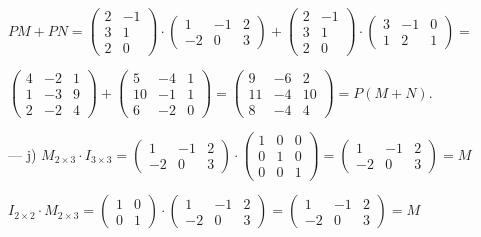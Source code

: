 \begin{proofw}
\small{\noindent $PM+PN= \left( \begin{matrix} 2&-1\\3&1\\2&0   \end{matrix} \right)\cdot \left( \begin{matrix} 1&-1&2\\-2&0&3   \end{matrix} \right) +
   \left( \begin{matrix} 2&-1\\3&1\\2&0   \end{matrix} \right)
   \cdot \left( \begin{matrix}  3&-1&0\\1&2&1  \end{matrix} \right) =$}
   
 \small{\noindent $\left( \begin{matrix}  4&-2&1\\1&-3&9\\2&-2&4   \end{matrix} \right) 
   +\left( \begin{matrix} 5&-4&1\\10&-1&1\\6&-2&0  \end{matrix} \right) 
   =
   \left( \begin{matrix} 9&-6&2\\11&-4&10\\8&-4&4   \end{matrix} \right) 
   =P(M+N)$}\normalsize{.}

   
   \noindent --- j) $M_{2\times 3}\cdot I_{3\times 3}= \left( \begin{matrix} 1&-1&2\\-2&0&3   \end{matrix} \right) \cdot 
   \left( \begin{matrix} 1&0&0\\0&1&0\\0&0&1 \end{matrix} \right) = \left( \begin{matrix} 1&-1&2\\-2&0&3   \end{matrix} \right)=M$
   
   \noindent $I_{2\times 2}\cdot M_{2\times 3}=\left( \begin{matrix} 1&0\\0&1 \end{matrix} \right) \cdot \left( \begin{matrix} 1&-1&2\\-2&0&3   \end{matrix} \right)=\left( \begin{matrix} 1&-1&2\\-2&0&3   \end{matrix} \right) =M$

\end{proofw}

